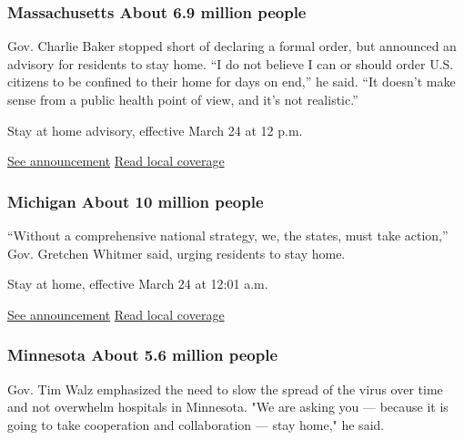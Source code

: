 \hypertarget{massachusetts-about-69-million-people}{%
\subsubsection{Massachusetts About 6.9 million
people}\label{massachusetts-about-69-million-people}}

Gov. Charlie Baker stopped short of declaring a formal order, but
announced an advisory for residents to stay home. ``I do not believe I
can or should order U.S. citizens to be confined to their home for days
on end,'' he said. ``It doesn't make sense from a public health point of
view, and it's not realistic.''

Stay at home advisory, effective March 24 at 12 p.m.

\href{https://www.mass.gov/news/governor-charlie-baker-orders-all-non-essential-businesses-to-cease-in-person-operation}{See
announcement} \textbar{}
\href{https://www.bostonglobe.com/2020/03/23/metro/list-what-can-stay-open-during-bakers-stay-at-home-advisory/}{Read
local coverage}

\hypertarget{michigan-about-10-million-people}{%
\subsubsection{Michigan About 10 million
people}\label{michigan-about-10-million-people}}

``Without a comprehensive national strategy, we, the states, must take
action,'' Gov. Gretchen Whitmer said, urging residents to stay home.

Stay at home, effective March 24 at 12:01 a.m.

\href{https://www.michigan.gov/whitmer/0,9309,7-387-90499_90705-522626--,00.html}{See
announcement} \textbar{}
\href{https://www.freep.com/story/news/local/michigan/2020/03/23/michigan-shelter-in-place-order-coronavirus/2887578001/}{Read
local coverage}

\hypertarget{minnesota-about-56-million-people}{%
\subsubsection{Minnesota About 5.6 million
people}\label{minnesota-about-56-million-people}}

Gov. Tim Walz emphasized the need to slow the spread of the virus over
time and not overwhelm hospitals in Minnesota. "We are asking you ---
because it is going to take cooperation and collaboration --- stay
home," he said.

